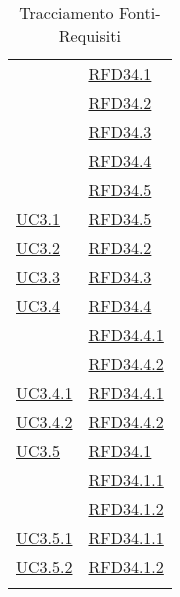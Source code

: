 \begin{longtable}{|>{\centering}m{5cm}|m{5cm}<{\centering}|}
& \hyperlink{RFD34.1}{RFD34.1}\\
& \hyperlink{RFD34.2}{RFD34.2}\\
& \hyperlink{RFD34.3}{RFD34.3}\\
& \hyperlink{RFD34.4}{RFD34.4}\\
& \hyperlink{RFD34.5}{RFD34.5}\\ \hline
\hyperref[UC3.1]{UC3.1} & \hyperlink{RFD34.5}{RFD34.5}\\ \hline
\hyperref[UC3.2]{UC3.2} & \hyperlink{RFD34.2}{RFD34.2}\\ \hline
\hyperref[UC3.3]{UC3.3} & \hyperlink{RFD34.3}{RFD34.3}\\ \hline
\hyperref[UC3.4]{UC3.4} & \hyperlink{RFD34.4}{RFD34.4}\\
& \hyperlink{RFD34.4.1}{RFD34.4.1}\\
& \hyperlink{RFD34.4.2}{RFD34.4.2}\\ \hline
\hyperref[UC3.4.1]{UC3.4.1} & \hyperlink{RFD34.4.1}{RFD34.4.1}\\ \hline
\hyperref[UC3.4.2]{UC3.4.2} & \hyperlink{RFD34.4.2}{RFD34.4.2}\\ \hline
\hyperref[UC3.5]{UC3.5} & \hyperlink{RFD34.1}{RFD34.1}\\
& \hyperlink{RFD34.1.1}{RFD34.1.1}\\
& \hyperlink{RFD34.1.2}{RFD34.1.2}\\ \hline
\hyperref[UC3.5.1]{UC3.5.1} & \hyperlink{RFD34.1.1}{RFD34.1.1}\\ \hline
\hyperref[UC3.5.2]{UC3.5.2} & \hyperlink{RFD34.1.2}{RFD34.1.2}\\ \hline
\caption[Tracciamento Fonti-Requisiti]{Tracciamento Fonti-Requisiti}
\label{tabella:fonti-requi}
\end{longtable}
\clearpage

